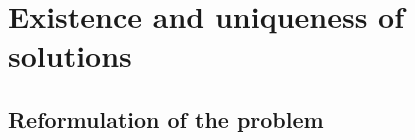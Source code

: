 \documentclass[12pt,a4paper]{article}
\numberwithin{equation}{subsection}
\numberwithin{lemma}{subsection}
\theoremstyle{definition}
\newcommand{\aop}{\mathscr{A}}
\newcommand{\lpcoho}{H^k_{p,dR}}
\newcommand{\omegabar}{\overline{\Omega}}
\newcommand{\rop}{\mathscr{R}} %
\begin{document}






\section{Existence and uniqueness of solutions}

\subsection{Reformulation of the problem} 
\end{document}
